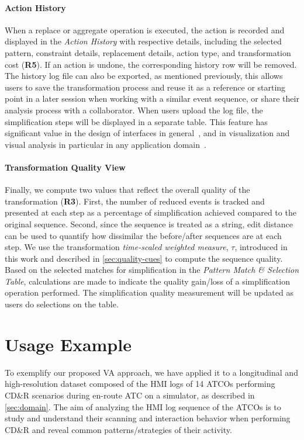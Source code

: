 \documentclass[camera]{vgtc}                          %
\begin{document}
\paragraph{Action History}
When a replace or aggregate operation is executed, the action is recorded and displayed in the \textit{Action History} with respective details, including the selected pattern, constraint details, replacement details, action type, and transformation cost (\textbf{R5}). If an action is undone, the corresponding history row will be removed. The history log file can also be exported, as mentioned previously, this allows users to save the transformation process and reuse it as a reference or starting point in a later session when working with a similar event sequence, or share their analysis process with a collaborator. When users upload the log file, the simplification steps will be displayed in a separate table.
This feature has significant value in the design of interfaces in general~\cite{Shneiderman2016Designing}, and in visualization and visual analysis in particular in any application domain~\cite{Silva2007Provenance, North2011Analytic}.

\paragraph{Transformation Quality View}
Finally, we compute two values that reflect the overall quality of the transformation (\textbf{R3}). First, the number of reduced events is tracked and presented at each step as a percentage of simplification achieved compared to the original sequence. Second, since the sequence is treated as a string, edit distance can be used to quantify how dissimilar the before/after sequences are at each step.
We use the transformation \textit{time-scaled weighted measure}, $\tau$, introduced in this work and described in \autoref{sec:quality-cues} to compute the sequence quality.
Based on the selected matches for simplification in the \textit{Pattern Match \& Selection Table}, calculations are made to indicate the quality gain/loss of a simplification operation performed.
The simplification quality measurement will be updated as users do selections on the table. 



\vspace{-4pt}
\section{Usage Example}
To exemplify our proposed VA approach, we have applied it to a longitudinal and high-resolution dataset composed of the HMI logs of 14 ATCOs performing CD\&R scenarios during en-route ATC on a simulator, as described in \autoref{sec:domain}. 
The aim of analyzing the HMI log sequence of the ATCOs is to study and understand their scanning and interaction behavior when performing CD\&R and reveal common patterns/strategies of their activity. 
\end{document}
